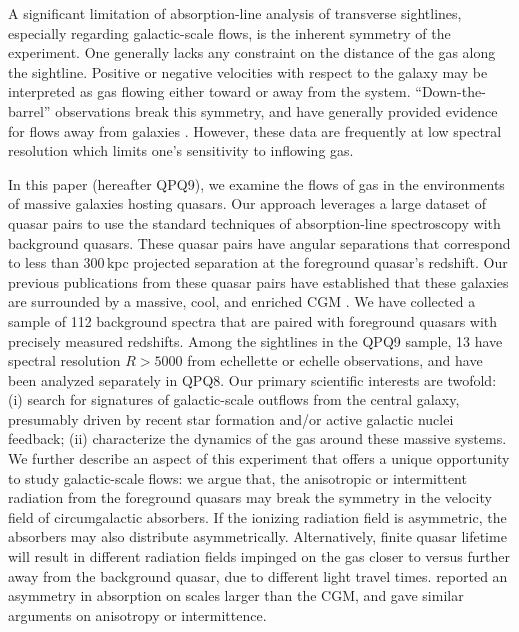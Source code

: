 \documentclass[iop]{emulateapj}
\begin{document}
A significant limitation of absorption-line analysis of transverse sightlines, especially 
regarding galactic-scale flows, is the inherent symmetry of the experiment. One generally lacks 
any constraint on the distance of the gas along the sightline. Positive or negative velocities 
with respect to the galaxy may be interpreted as gas flowing either toward or away from the 
system. ``Down-the-barrel'' observations break this symmetry, and have generally provided evidence 
for flows away from galaxies \citep{Rupke+05,Martin05,Weiner+09,Rubin+14}. However, these data are 
frequently at low spectral resolution which limits one's sensitivity to inflowing gas. 

In this paper (hereafter QPQ9), we examine the flows of gas in the environments of massive 
galaxies hosting quasars. Our approach leverages a large dataset of quasar pairs 
\citep[][, hereafter QPQ1]{QPQ1} to use the standard techniques of absorption-line spectroscopy 
with background quasars. These quasar pairs 
have angular separations that correspond to less than 300\,kpc projected separation at the 
foreground quasar's redshift. Our previous publications from these quasar pairs have established 
that these galaxies are surrounded by a massive, cool, and enriched CGM 
\citep[QPQ5, QPQ6, QPQ7:][]{QPQ5,QPQ6,QPQ7}. We have collected a sample of 112 background 
spectra that are paired with foreground quasars with precisely measured redshifts. 
Among the sightlines in the QPQ9 sample, 13 have spectral resolution $R>5000$ from echellette or 
echelle observations, and have been analyzed separately in QPQ8. Our primary 
scientific interests are twofold: (i) search for signatures of galactic-scale outflows from the 
central galaxy, presumably driven by recent star formation and/or active galactic nuclei feedback; 
(ii) characterize the dynamics of the gas around these massive systems. We further describe 
an aspect of this experiment that offers a unique opportunity to study galactic-scale flows: we 
argue that, the anisotropic or intermittent radiation from the foreground quasars may break the 
symmetry in the velocity field of circumgalactic absorbers. If the ionizing radiation field is 
asymmetric, the absorbers may also distribute asymmetrically. Alternatively, finite quasar 
lifetime will result in different radiation fields impinged on the gas closer to versus 
further away from the background quasar, due to different light travel times. 
\cite{KirkmanTytler08} reported an asymmetry in  absorption on scales larger than the 
CGM, and gave similar arguments on anisotropy or intermittence.
\end{document}
